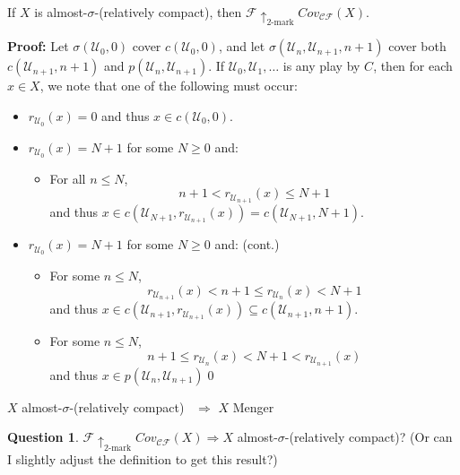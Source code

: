 \documentclass{beamer}
\theoremstyle{theorem}
\theoremstyle{definition}
\newtheorem{question}[theorem]{Question}
\newcommand{\kmarkwin}[1]{\uparrow_{#1\text{-mark}}}
\newcommand{\mengame}[1]{Cov_{\pl C\pl F}(#1)}
\newcommand{\<}{\langle}
\renewcommand{\>}{\rangle}
\newcommand{\mc}[1]{\mathcal{#1}}
\newcommand{\scish}{almost-$\sigma$-(relatively compact)}
\newcommand{\pl}[1]{\mathscr{#1}}
\begin{document}
\begin{frame}

  \begin{theorem}
    If $X$ is \scish, then $\pl F \kmarkwin{2} \mengame{X}$.
  \end{theorem}\pause

  \textbf{Proof:}
    Let $\sigma(\mc{U}_0,0)$ cover $c(\mc{U}_0,0)$, and let $\sigma(\mc{U}_n,\mc{U}_{n+1},n+1)$ cover both $c(\mc{U}_{n+1},n+1)$ and $p(\mc{U}_n,\mc{U}_{n+1})$. If $\mc{U}_0,\mc{U}_1,\dots$ is any play by $C$, then for each $x\in X$, we note that one of the following must occur:\pause
      \begin{itemize}
        \item $r_{\mc U_0}(x)=0$ and thus $x\in c(\mc U_0,0)$.\pause
        \item $r_{\mc U_0}(x)=N+1$ for some $N\geq 0$ and:\pause
        \begin{itemize}
          \item For all $n\leq N$, 
            \[
              n+1< r_{\mc U_{n+1}}(x)\leq N+1
            \] 
            and thus $x\in c(\mc U_{N+1},r_{\mc U_{n+1}}(x))=c(\mc U_{N+1},N+1)$.
        \end{itemize}
      \end{itemize}
\end{frame}
\begin{frame}
      \begin{itemize}
      \item $r_{\mc U_0}(x)=N+1$ for some $N\geq 0$ and: (cont.)
        \begin{itemize}
          \item For some $n \leq N$,
            \[
              r_{\mc U_{n+1}}(x)< n+1 \leq r_{\mc U_n}(x)< N+1
            \]
            and thus $x\in c(\mc U_{n+1},r_{\mc U_{n+1}}(x))\subseteq c(\mc U_{n+1},n+1)$.\pause
          \item For some $n \leq N$, 
            \[
              n+1 \leq r_{\mc U_n}(x)< N+1 < r_{\mc U_{n+1}}(x)
            \]
           and thus $x\in p(\mc U_n,\mc U_{n+1})$\qed
         \end{itemize}
      \end{itemize}\pause

  \begin{corollary}
    $X$ \scish~ $\Rightarrow$ $X$ Menger
  \end{corollary}\pause

  \begin{question}
    $\pl F \kmarkwin{2} \mengame{X} \Rightarrow X$ \scish? (Or can I slightly adjust the definition to get this result?)
  \end{question}
\end{frame}
\end{document}
